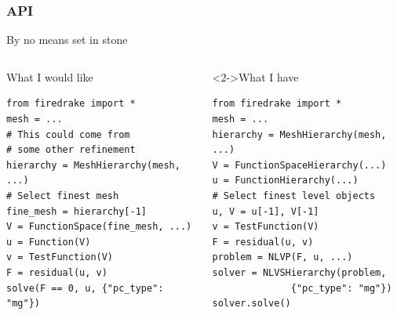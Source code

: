 \documentclass[presentation]{beamer}
\begin{document}
\begin{frame}[fragile]
  \frametitle{API}
By no means set in stone

  \begin{columns}
    \begin{column}{0.5\textwidth}
      \begin{block}{What I would like}
\begin{verbatim}
from firedrake import *
mesh = ...
# This could come from 
# some other refinement
hierarchy = MeshHierarchy(mesh, ...)
# Select finest mesh
fine_mesh = hierarchy[-1]
V = FunctionSpace(fine_mesh, ...)
u = Function(V)
v = TestFunction(V)
F = residual(u, v)
solve(F == 0, u, {"pc_type": "mg"})
\end{verbatim}
      \end{block}
    \end{column}
    \begin{column}{0.5\textwidth}
      \begin{block}<2->{What I have}
\begin{verbatim}
from firedrake import *
mesh = ...
hierarchy = MeshHierarchy(mesh, ...)
V = FunctionSpaceHierarchy(...)
u = FunctionHierarchy(...)
# Select finest level objects
u, V = u[-1], V[-1]
v = TestFunction(V)
F = residual(u, v)
problem = NLVP(F, u, ...)
solver = NLVSHierarchy(problem, 
              {"pc_type": "mg"})
solver.solve()
\end{verbatim}
      \end{block}
    \end{column}
  \end{columns}
\end{frame}
\end{document}
